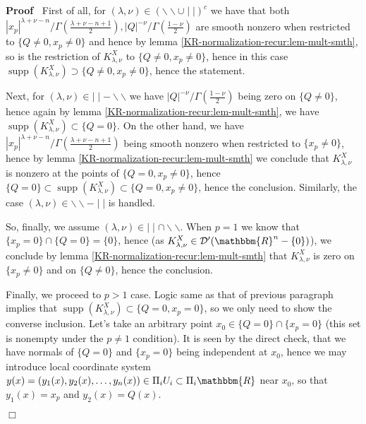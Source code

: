 \documentclass[12pt]{article}
\newcommand{\tmop}[1]{\ensuremath{\operatorname{#1}}}
\renewenvironment{proof}{\noindent\textbf{Proof\ }}{\hspace*{\fill}$\Box$\medskip}
\theoremstyle{remark}
\begin{document}
\begin{proof}
  First of all, for $(\lambda, \nu) \in (\backslash\backslash \cup \mid
  \mid)^c$ we have that both $| x_p |^{\lambda + \nu - n} / \Gamma \left(
  \frac{\lambda + \nu - n + 1}{2} \right), | Q |^{- \nu} / \Gamma \left(
  \frac{1 - \nu}{2} \right)$ are smooth nonzero when restricted to $\{ Q \neq
  0, x_p \neq 0 \}$ and hence by lemma
  \ref{KR-normalization-recur:lem-mult-smth}, so is the restriction of
  $K_{\lambda, \nu}^X$ to $\{ Q \neq 0, x_p \neq 0 \}$, hence in this case
  $\tmop{supp} (K_{\lambda, \nu}^X) \supset \{ Q \neq 0, x_p \neq 0 \}$, hence
  the statement.
  
  Next, for $(\lambda, \nu) \in \mid \mid -\backslash\backslash$ we have $| Q
  |^{- \nu} / \Gamma \left( \frac{1 - \nu}{2} \right)$ being zero on $\{ Q
  \neq 0 \}$, hence again by lemma \ref{KR-normalization-recur:lem-mult-smth},
  we have $\tmop{supp} (K_{\lambda, \nu}^X) \subset \{ Q = 0 \}$. On the other
  hand, we have $| x_p |^{\lambda + \nu - n} / \Gamma \left( \frac{\lambda +
  \nu - n + 1}{2} \right)$ being smooth nonzero when restricted to $\{ x_p
  \neq 0 \}$, hence by lemma \ref{KR-normalization-recur:lem-mult-smth} we
  conclude that $K_{\lambda, \nu}^X$ is nonzero at the points of $\{ Q = 0,
  x_p \neq 0 \}$, hence $\{ Q = 0 \} \subset \tmop{supp} (K_{\lambda, \nu}^X)
  \subset \{ Q = 0, x_p \neq 0 \}$, hence the conclusion. Similarly, the case
  $(\lambda, \nu) \in \backslash\backslash - \mid \mid$ is handled.
  
  So, finally, we assume $(\lambda, \nu) \in \mid \mid \cap
  \backslash\backslash$. When $p = 1$ we know that $\{ x_p = 0 \} \cap \{ Q =
  0 \} = \{ 0 \}$, hence (as $K_{\lambda, \nu}^X \in \mathcal{D}'
  (\mathbbm{R}^n - \{ 0 \})$), we conclude by lemma
  \ref{KR-normalization-recur:lem-mult-smth} that $K_{\lambda, \nu}^X$ is zero
  on $\{ x_p \neq 0 \}$ and on $\{ Q \neq 0 \}$, hence the conclusion.
  
  Finally, we proceed to $p > 1$ case. Logic same as that of previous
  paragraph implies that $\tmop{supp} (K_{\lambda, \nu}^X) \subset \{ Q = 0,
  x_p = 0 \}$, so we only need to show the converse inclusion. Let's take an
  arbitrary point $x_0 \in \{ Q = 0 \} \cap \{ x_p = 0 \}$ (this set is
  nonempty under the $p \neq 1$ condition). It is seen by the direct check,
  that we have normals of $\{ Q = 0 \}$ and $\{ x_p = 0 \}$ being independent
  at $x_0$, hence we may introduce local coordinate system $y (x) = (y_1 (x),
  y_2 (x), \ldots, y_n (x)) \in \Pi_i U_i \subset \Pi_i \mathbbm{R}$ near
  $x_0$, so that $y_1 (x) = x_p$ and $y_2 (x) = Q (x)$.
  

\end{proof}
\end{document}
